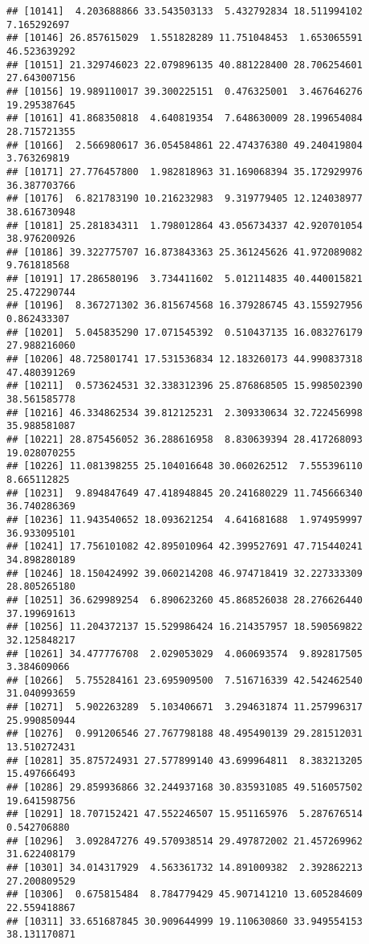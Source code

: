 \documentclass[
]{article}
\begin{document}
\begin{verbatim}
## [10141]  4.203688866 33.543503133  5.432792834 18.511994102  7.165292697
## [10146] 26.857615029  1.551828289 11.751048453  1.653065591 46.523639292
## [10151] 21.329746023 22.079896135 40.881228400 28.706254601 27.643007156
## [10156] 19.989110017 39.300225151  0.476325001  3.467646276 19.295387645
## [10161] 41.868350818  4.640819354  7.648630009 28.199654084 28.715721355
## [10166]  2.566980617 36.054584861 22.474376380 49.240419804  3.763269819
## [10171] 27.776457800  1.982818963 31.169068394 35.172929976 36.387703766
## [10176]  6.821783190 10.216232983  9.319779405 12.124038977 38.616730948
## [10181] 25.281834311  1.798012864 43.056734337 42.920701054 38.976200926
## [10186] 39.322775707 16.873843363 25.361245626 41.972089082  9.761818568
## [10191] 17.286580196  3.734411602  5.012114835 40.440015821 25.472290744
## [10196]  8.367271302 36.815674568 16.379286745 43.155927956  0.862433307
## [10201]  5.045835290 17.071545392  0.510437135 16.083276179 27.988216060
## [10206] 48.725801741 17.531536834 12.183260173 44.990837318 47.480391269
## [10211]  0.573624531 32.338312396 25.876868505 15.998502390 38.561585778
## [10216] 46.334862534 39.812125231  2.309330634 32.722456998 35.988581087
## [10221] 28.875456052 36.288616958  8.830639394 28.417268093 19.028070255
## [10226] 11.081398255 25.104016648 30.060262512  7.555396110  8.665112825
## [10231]  9.894847649 47.418948845 20.241680229 11.745666340 36.740286369
## [10236] 11.943540652 18.093621254  4.641681688  1.974959997 36.933095101
## [10241] 17.756101082 42.895010964 42.399527691 47.715440241 34.898280189
## [10246] 18.150424992 39.060214208 46.974718419 32.227333309 28.805265180
## [10251] 36.629989254  6.890623260 45.868526038 28.276626440 37.199691613
## [10256] 11.204372137 15.529986424 16.214357957 18.590569822 32.125848217
## [10261] 34.477776708  2.029053029  4.060693574  9.892817505  3.384609066
## [10266]  5.755284161 23.695909500  7.516716339 42.542462540 31.040993659
## [10271]  5.902263289  5.103406671  3.294631874 11.257996317 25.990850944
## [10276]  0.991206546 27.767798188 48.495490139 29.281512031 13.510272431
## [10281] 35.875724931 27.577899140 43.699964811  8.383213205 15.497666493
## [10286] 29.859936866 32.244937168 30.835931085 49.516057502 19.641598756
## [10291] 18.707152421 47.552246507 15.951165976  5.287676514  0.542706880
## [10296]  3.092847276 49.570938514 29.497872002 21.457269962 31.622408179
## [10301] 34.014317929  4.563361732 14.891009382  2.392862213 27.200809529
## [10306]  0.675815484  8.784779429 45.907141210 13.605284609 22.559418867
## [10311] 33.651687845 30.909644999 19.110630860 33.949554153 38.131170871

\end{verbatim}
\end{document}
